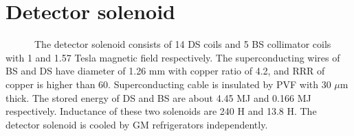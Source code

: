 \section{Detector solenoid}
~~~~~~The detector solenoid consists of 14 DS coils and 5 BS collimator coils with 1 and 1.57 Tesla magnetic field respectively.
The superconducting wires of BS and DS have diameter of 1.26 mm with copper ratio of 4.2, and RRR of copper is higher than 60.
Superconducting cable is insulated by PVF with 30 $\mu$m thick.
The stored energy of DS and BS are about 4.45 MJ and 0.166 MJ respectively.
Inductance of these two solenoids are 240 H and 13.8 H.
The detector solenoid is cooled by GM refrigerators independently.



